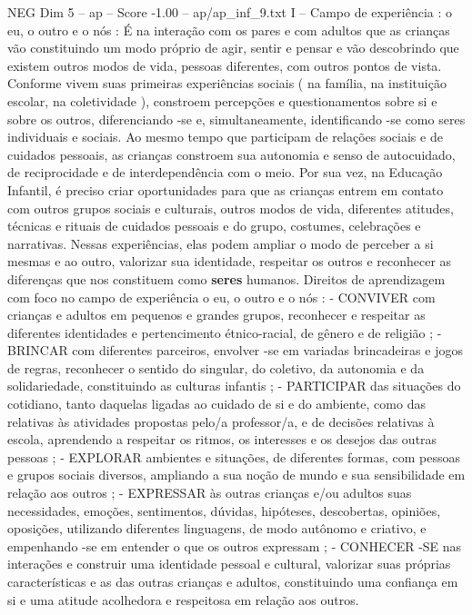 \begin{textsample}{NEG Dim 5 – ap – Score -1.00 – ap/ap\_inf\_9.txt}  \label{ex:f5_neg_128}
I – Campo de experiência : o eu, o outro e o nós : É na interação com os pares e com adultos que as crianças vão constituindo um modo próprio de agir, sentir e pensar e vão descobrindo que existem outros modos de vida, pessoas diferentes, com outros pontos de vista.
Conforme vivem suas primeiras experiências sociais ( na família, na instituição escolar, na coletividade ), constroem percepções e questionamentos sobre si e sobre os outros, diferenciando -se e, simultaneamente, identificando -se como seres individuais e sociais.
Ao mesmo tempo que participam de relações sociais e de cuidados pessoais, as crianças constroem sua autonomia e senso de autocuidado, de reciprocidade e de interdependência com o meio.
Por sua vez, na Educação Infantil, é preciso criar oportunidades para que as crianças entrem em contato com outros grupos sociais e culturais, outros modos de vida, diferentes atitudes, técnicas e rituais de cuidados pessoais e do grupo, costumes, celebrações e narrativas.
Nessas experiências, elas podem ampliar o modo de perceber a si mesmas e ao outro, valorizar sua identidade, respeitar os outros e reconhecer as diferenças que nos constituem como \textbf{seres} humanos.
Direitos de aprendizagem com foco no campo de experiência o eu, o outro e o nós : - CONVIVER com crianças e adultos em pequenos e grandes grupos, reconhecer e respeitar as diferentes identidades e pertencimento étnico-racial, de gênero e de religião ; - BRINCAR com diferentes parceiros, envolver -se em variadas brincadeiras e jogos de regras, reconhecer o sentido do singular, do coletivo, da autonomia e da solidariedade, constituindo as culturas infantis ; - PARTICIPAR das situações do cotidiano, tanto daquelas ligadas ao cuidado de si e do ambiente, como das relativas às atividades propostas pelo/a professor/a, e de decisões relativas à escola, aprendendo a respeitar os ritmos, os interesses e os desejos das outras pessoas ; - EXPLORAR ambientes e situações, de diferentes formas, com pessoas e grupos sociais diversos, ampliando a sua noção de mundo e sua sensibilidade em relação aos outros ; - EXPRESSAR às outras crianças e/ou adultos suas necessidades, emoções, sentimentos, dúvidas, hipóteses, descobertas, opiniões, oposições, utilizando diferentes linguagens, de modo autônomo e criativo, e empenhando -se em entender o que os outros expressam ; - CONHECER -SE nas interações e construir uma identidade pessoal e cultural, valorizar suas próprias características e as das outras crianças e adultos, constituindo uma confiança em si e uma atitude acolhedora e respeitosa em relação aos outros.

\end{textsample}
